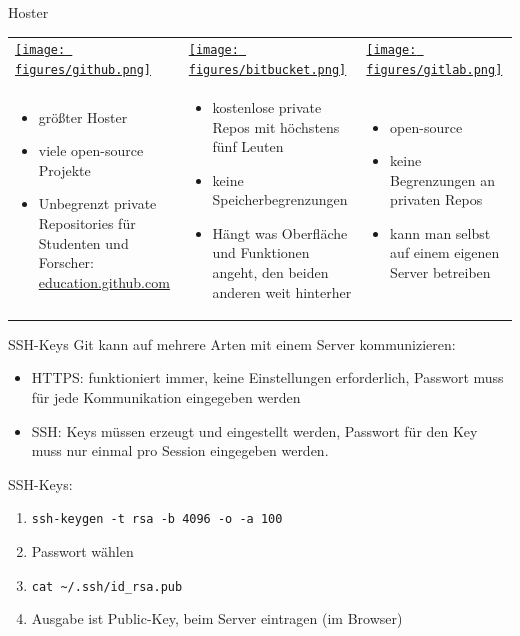 \begin{frame}{Hoster}
  \begin{tabu}{@{} X[,C] @{} X[,C] @{} X[,C] @{}}
    \href{https://github.com}{\texttt{[image: figures/github.png]}} &
    \href{https://bitbucket.org}{\texttt{[image: figures/bitbucket.png]}} &
    \href{https://gitlab.com}{\texttt{[image: figures/gitlab.png]}} \\
    \begin{itemize}
      \item größter Hoster
      \item viele open-source Projekte
      \item Unbegrenzt private Repositories für Studenten und Forscher:  \newline
        \href{http://education.github.com}{education.github.com}
    \end{itemize}
    &
    \begin{itemize}
      \item kostenlose private Repos mit höchstens fünf Leuten
      \item keine Speicherbegrenzungen
      \item Hängt was Oberfläche und Funktionen angeht, den beiden anderen weit hinterher
    \end{itemize}
    &
    \begin{itemize}
      \item open-source
      \item keine Begrenzungen an privaten Repos
      \item kann man selbst auf einem eigenen Server betreiben
    \end{itemize}
  \end{tabu}
  \begin{center}
  \end{center}
\end{frame}

\begin{frame}{SSH-Keys}
  Git kann auf mehrere Arten mit einem Server kommunizieren:
  \begin{itemize}
    \item HTTPS: funktioniert immer, keine Einstellungen erforderlich, Passwort muss für jede Kommunikation eingegeben werden
    \item SSH: Keys müssen erzeugt und eingestellt werden, Passwort für den Key muss nur einmal pro Session eingegeben werden.
  \end{itemize}

  SSH-Keys:
  \begin{enumerate}
    \item \texttt{ssh-keygen -t rsa -b 4096 -o -a 100}
    \item Passwort wählen
    \item \texttt{cat \textasciitilde/.ssh/id\_rsa.pub}
    \item Ausgabe ist Public-Key, beim Server eintragen (im Browser)
  \end{enumerate}
\end{frame}
